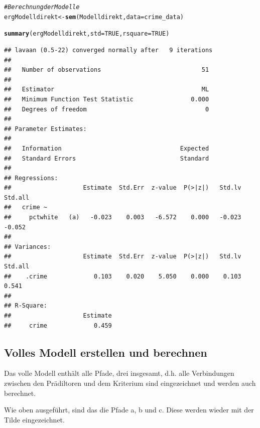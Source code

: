 \documentclass[a4paper]{article}\usepackage[]{graphicx}\usepackage[]{color}
\makeatletter
\newcommand{\hlnum}[1]{\textcolor[rgb]{0.686,0.059,0.569}{#1}}%
\newcommand{\hlcom}[1]{\textcolor[rgb]{0.678,0.584,0.686}{\textit{#1}}}%
\newcommand{\hlstd}[1]{\textcolor[rgb]{0.345,0.345,0.345}{#1}}%
\newcommand{\hlkwb}[1]{\textcolor[rgb]{0.69,0.353,0.396}{#1}}%
\newcommand{\hlkwc}[1]{\textcolor[rgb]{0.333,0.667,0.333}{#1}}%
\newcommand{\hlkwd}[1]{\textcolor[rgb]{0.737,0.353,0.396}{\textbf{#1}}}%
\newenvironment{kframe}{%
 \def\at@end@of@kframe{}%
 \ifinner\ifhmode%
  \def\at@end@of@kframe{\end{minipage}}%
  \begin{minipage}{\columnwidth}%
 \fi\fi%
 \def\FrameCommand##1{\hskip\@totalleftmargin \hskip-\fboxsep
 \colorbox{shadecolor}{##1}\hskip-\fboxsep
     \hskip-\linewidth \hskip-\@totalleftmargin \hskip\columnwidth}%
 \MakeFramed {\advance\hsize-\width
   \@totalleftmargin\z@ \linewidth\hsize
   \@setminipage}}%
 {\par\unskip\endMakeFramed%
 \at@end@of@kframe}
\newenvironment{knitrout}{}{} %
\makeatother
\begin{document}
\begin{knitrout}
\color{fgcolor}\begin{kframe}
\begin{alltt}
\hlcom{# Berechnung der Modelle}
\hlstd{ergModelldirekt} \hlkwb{<-} \hlkwd{sem}\hlstd{(Modelldirekt,} \hlkwc{data} \hlstd{= crime_data)}
\end{alltt}


{\ttfamily\noindent\itshape{}}\begin{alltt}
\hlkwd{summary}\hlstd{(ergModelldirekt,} \hlkwc{std}\hlstd{=}\hlnum{TRUE}\hlstd{,} \hlkwc{rsquare}\hlstd{=}\hlnum{TRUE}\hlstd{)}
\end{alltt}
\begin{verbatim}
## lavaan (0.5-22) converged normally after   9 iterations
## 
##   Number of observations                            51
## 
##   Estimator                                         ML
##   Minimum Function Test Statistic                0.000
##   Degrees of freedom                                 0
## 
## Parameter Estimates:
## 
##   Information                                 Expected
##   Standard Errors                             Standard
## 
## Regressions:
##                    Estimate  Std.Err  z-value  P(>|z|)   Std.lv  Std.all
##   crime ~                                                               
##     pctwhite   (a)   -0.023    0.003   -6.572    0.000   -0.023   -0.052
## 
## Variances:
##                    Estimate  Std.Err  z-value  P(>|z|)   Std.lv  Std.all
##    .crime             0.103    0.020    5.050    0.000    0.103    0.541
## 
## R-Square:
##                    Estimate
##     crime             0.459
\end{verbatim}
\end{kframe}
\end{knitrout}

\subsection{Volles Modell erstellen und berechnen}
Das volle Modell enthält alle Pfade, drei insgesamt, d.h. alle Verbindungen zwischen den Prädiltoren und dem Kriterium sind eingezeichnet und werden auch berechnet.

Wie oben ausgeführt, sind das die Pfade a, b und c. Diese werden wieder mit der Tilde eingezeichnet.
\end{document}
